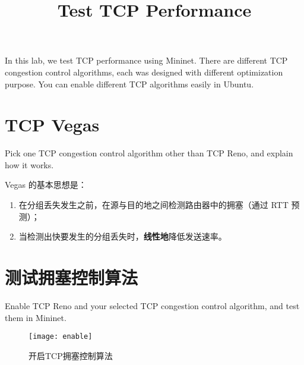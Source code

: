\endofdump
{}

    \title{Test TCP Performance}
    \maketitle
    \tableofcontents
    \vfill
    In this lab, we test TCP performance using Mininet. There are different TCP congestion control algorithms, each was designed with different optimization purpose. You can enable different TCP algorithms easily in Ubuntu.
    \vfill
    \clearpage
    \section{TCP Vegas}
    Pick one TCP congestion control algorithm other than TCP Reno, and explain how it works.

    Vegas 的基本思想是：
    \begin{enumerate}[(1)]
        \item 在分组丢失发生之前，在源与目的地之间检测路由器中的拥塞（通过 RTT 预测）；
        \item 当检测出快要发生的分组丢失时，\textbf{线性地}降低发送速率。
    \end{enumerate}

    \section{测试拥塞控制算法}
    Enable TCP Reno and your selected TCP congestion control algorithm, and test them in Mininet.

    \begin{figure}[H]
        \centering
        \texttt{[image: enable]}
        \caption{开启TCP拥塞控制算法}\label{fig:enable}
    \end{figure}

